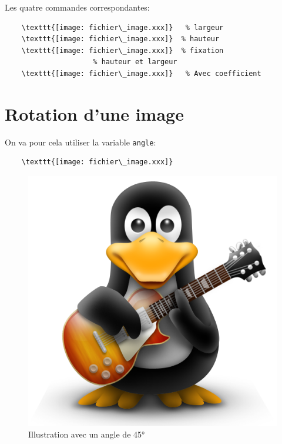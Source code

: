 Les quatre commandes correspondantes:
\begin{verbatim}
    \texttt{[image: fichier\_image.xxx]}   % largeur
    \texttt{[image: fichier\_image.xxx]}  % hauteur
    \texttt{[image: fichier\_image.xxx]}  % fixation 
                     % hauteur et largeur
    \texttt{[image: fichier\_image.xxx]}   % Avec coefficient
\end{verbatim}
\medskip

\section{Rotation d'une image}
On va pour cela utiliser la variable \texttt{angle}:
\begin{verbatim}
    \texttt{[image: fichier\_image.xxx]}
\end{verbatim}
\medskip

\begin{figure}[h]
\begin{center}
\includegraphics[scale=0.25, angle=45]{IMG/tux.png}
\caption{Illustration avec un angle de 45°}
\end{center}
\end{figure}
\medskip

